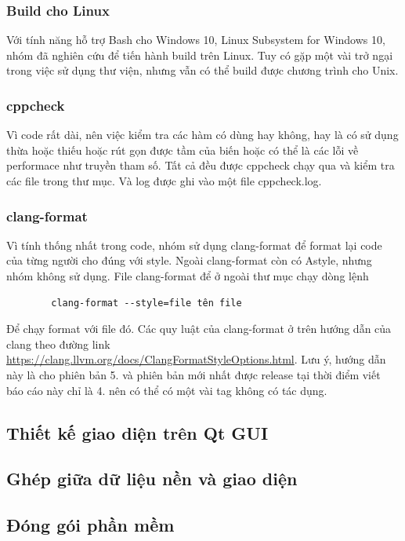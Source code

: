 \documentclass[12pt,a4paper]{report}
\begin{document}
		\subsubsection{Build cho Linux}

		Với tính năng hỗ trợ Bash cho Windows 10, Linux Subsystem for Windows 10, nhóm đã nghiên cứu để tiến hành build trên Linux. Tuy có gặp một vài trở ngại trong việc sử dụng thư viện, nhưng vẫn có thể build được chương trình cho Unix.

		\subsubsection{cppcheck}

		Vì code rất dài, nên việc kiểm tra các hàm có dùng hay không, hay là có sử dụng thừa hoặc thiếu hoặc rút gọn được tầm của biến hoặc có thể là các lỗi về performace như truyền tham số. Tất cả đều được cppcheck chạy qua và kiểm tra các file trong thư mục. Và log được ghi vào một file cppcheck.log.

		\subsubsection{clang-format}

		Vì tính thống nhất trong code, nhóm sử dụng clang-format để format lại code của từng người cho đúng với style. Ngoài clang-format còn có Astyle, nhưng nhóm không sử dụng. File clang-format để ở ngoài thư mục chạy dòng lệnh
		\begin{verbatim}
		clang-format --style=file tên file
		\end{verbatim}
		Để chạy format với file đó.
		Các quy luật của clang-format ở trên hướng dẫn của clang theo đường link \url{https://clang.llvm.org/docs/ClangFormatStyleOptions.html}. Lưu ý, hướng dẫn này là cho phiên bản 5. và phiên bản mới nhất được release tại thời điểm viết báo cáo này chỉ là 4. nên có thể có một vài tag không có tác dụng.

		\subsection{Thiết kế giao diện trên Qt GUI}
		\subsection{Ghép giữa dữ liệu nền và giao diện}
		\subsection{Đóng gói phần mềm}
\end{document}
